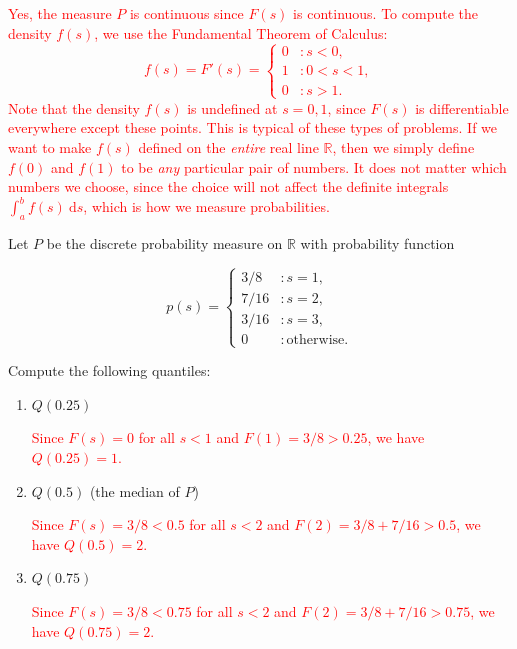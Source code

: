 \documentclass[12pt,reqno]{amsart}
\begin{document}
\bigskip
\textcolor{red}{Yes, the measure $P$ is continuous since $F(s)$ is continuous. To compute the density $f(s)$, we use the Fundamental Theorem of Calculus:
	\[
	f(s) = F'(s) = \begin{cases}
	0 & : s < 0, \\
	1 & : 0 < s < 1, \\
	0 & : s>1.
	\end{cases}
	\]
Note that the density $f(s)$ is undefined at $s=0,1$, since $F(s)$ is differentiable everywhere except these points. This is typical of these types of problems. If we want to make $f(s)$ defined on the \textit{entire} real line $\mathbb{R}$, then we simply define $f(0)$ and $f(1)$ to be \textit{any} particular pair of numbers. It does not matter which numbers we choose, since the choice will not affect the definite integrals $\int_a^b f(s) \ \text{d} s$, which is how we measure probabilities.}
















\bigskip
\prob Let $P$ be the discrete probability measure on $\mathbb{R}$ with probability function

	\[
	p(s) = \begin{cases}
	3/8 & : s=1, \\
	7/16 & : s=2, \\
	3/16 & : s=3, \\
	0 & : \text{otherwise}.
	\end{cases}
	\]

Compute the following quantiles:

\medskip
\begin{enumerate}
\item $Q(0.25)$
    
\bigskip
\textcolor{red}{Since $F(s)=0$ for all $s<1$ and $F(1)=3/8>0.25$, we have $Q(0.25) = 1$.}
\bigskip

\item $Q(0.5)$ (the median of $P$)
    
\bigskip
\textcolor{red}{Since $F(s)=3/8<0.5$ for all $s<2$ and $F(2)=3/8 + 7/16 >0.5$, we have $Q(0.5) = 2$.}
\bigskip

\item $Q(0.75)$
    
\bigskip
\textcolor{red}{Since $F(s)=3/8<0.75$ for all $s<2$ and $F(2)=3/8 + 7/16 >0.75$, we have $Q(0.75) = 2$.}
\end{enumerate}
\end{document}
